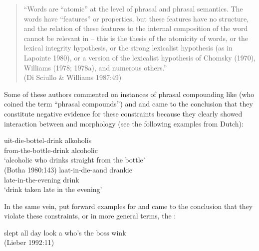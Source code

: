 \documentclass[output=paper]{LSP/langsci}
\begin{document}
\begin{quote}
``Words are ``atomic'' at the level of phrasal  and phrasal semantics. The
words have ``features'' or properties, but these features have no structure, and
the relation of these features to the internal composition of the word cannot be
relevant in  -- this is the thesis of the atomicity of words, or the lexical
integrity hypothesis, or the strong lexicalist hypothesis (as in Lapointe 1980), or
a version of the lexicalist hypothesis of Chomsky (1970), Williams (1978;
1978a), and numerous others.''\\
{\small (Di Sciullo \& Williams 1987:49) \nocite{disciuwill1987}}
\end{quote}

Some of these authors commented on instances of phrasal compounding
like \cite{Botha1980} (who coined the term ``phrasal compounds'') and
\cite{Savini1984} and came to the conclusion that they constitute
negative evidence for these constraints because they clearly showed
interaction between  and morphology (see the following examples
from Dutch): 

\ea\label{pcbothasavini}
 \ea
 \gll uit-die-bottel-drink alkoholis\\
from-the-bottle-drink alcoholic\\
\glt `alcoholic who drinks straight from the bottle'\\
\glend (Botha 1980:143)
 \ex 
\gll laat-in-die-aand drankie\\
late-in-the-evening drink\\
\glt `drink taken late in the evening'\\
\glend \citep[39]{Savini1984}
\z
\z

In the same vein, \citet{Lieber1988,Lieber1992} put forward examples
for  and came to the conclusion that they violate these
constraints, or in more general terms, the :


\ea\label{pclieber}
 \ea slept all day look
 \ex a who's the boss wink\\
(Lieber 1992:11)
\z
\z
\end{document}
